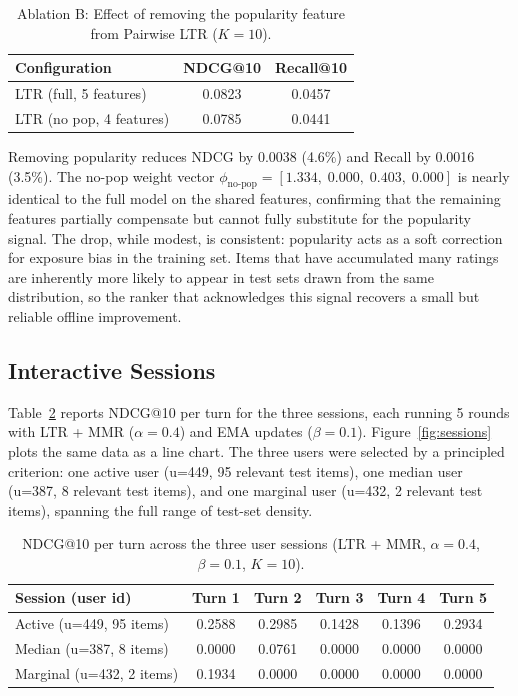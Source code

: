 \documentclass[11pt]{article}
\begin{document}
\begin{table}[H]
\centering
\caption{Ablation B: Effect of removing the popularity feature from Pairwise LTR ($K=10$).}
\label{tab:abl-b}
\begin{tabular}{lcc}
\toprule
\textbf{Configuration}         & \textbf{NDCG@10} & \textbf{Recall@10} \\
\midrule
LTR (full, 5 features)         & 0.0823           & 0.0457             \\
LTR (no pop, 4 features)       & 0.0785           & 0.0441             \\
\bottomrule
\end{tabular}
\end{table}

\noindent Removing popularity reduces NDCG by 0.0038 (4.6\%) and Recall by 0.0016 (3.5\%). The no-pop weight vector $\phi_{\text{no-pop}} = [1.334,\; 0.000,\; 0.403,\; 0.000]$ is nearly identical to the full model on the shared features, confirming that the remaining features partially compensate but cannot fully substitute for the popularity signal. The drop, while modest, is consistent: popularity acts as a soft correction for exposure bias in the training set. Items that have accumulated many ratings are inherently more likely to appear in test sets drawn from the same distribution, so the ranker that acknowledges this signal recovers a small but reliable offline improvement.

\subsection{Interactive Sessions}
\label{sec:sessions}

\noindent Table~\ref{tab:sessions} reports NDCG@10 per turn for the three sessions, each running 5 rounds with LTR + MMR ($\alpha = 0.4$) and EMA updates ($\beta = 0.1$). Figure~\ref{fig:sessions} plots the same data as a line chart. The three users were selected by a principled criterion: one active user (u=449, 95 relevant test items), one median user (u=387, 8 relevant test items), and one marginal user (u=432, 2 relevant test items), spanning the full range of test-set density.

\begin{table}[H]
\centering
\caption{NDCG@10 per turn across the three user sessions (LTR + MMR, $\alpha=0.4$, $\beta=0.1$, $K=10$).}
\label{tab:sessions}
\begin{tabular}{lccccc}
\toprule
\textbf{Session (user id)} & \textbf{Turn 1} & \textbf{Turn 2} & \textbf{Turn 3} & \textbf{Turn 4} & \textbf{Turn 5} \\
\midrule
Active (u=449, 95 items)   & 0.2588          & 0.2985          & 0.1428          & 0.1396          & 0.2934          \\
Median (u=387, 8 items)    & 0.0000          & 0.0761          & 0.0000          & 0.0000          & 0.0000          \\
Marginal (u=432, 2 items)  & 0.1934          & 0.0000          & 0.0000          & 0.0000          & 0.0000          \\
\bottomrule
\end{tabular}
\end{table}
\end{document}
